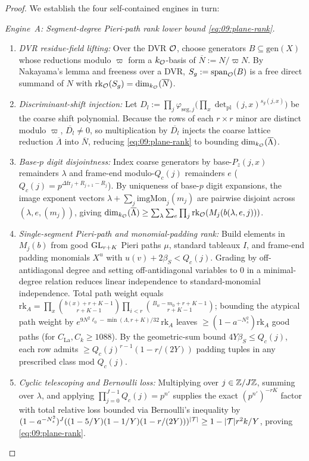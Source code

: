 \begin{proof}
We establish the four self-contained engines in turn:

\medskip\noindent
\emph{Engine~A: Segment-degree Pieri-path rank lower bound \eqref{eq:09:plane-rank}.}
\begin{enumerate}[label=\textup{\arabic*.}]
\item \emph{DVR residue-field lifting:} Over the DVR $\mathcal{O}$, choose generators $B \subseteq \mathrm{gen}(X)$ whose reductions modulo $\varpi$ form a $k_{\mathcal{O}}$-basis of $\overline{N} := N / \varpi N$. By Nakayama's lemma and freeness over a DVR, $S_g := \operatorname{span}_{\mathcal{O}}(B)$ is a free direct summand of $N$ with $\operatorname{rk}_{\mathcal{O}}(S_g) = \dim_{k_{\mathcal{O}}}(\overline{N})$.
\item \emph{Discriminant-shift injection:} Let $D_l := \prod_j \varphi_{\mathrm{seg},j}\bigl(\prod_{x} \det_{\mathrm{pl}}(j,x)^{s_g(j,x)}\bigr)$ be the coarse shift polynomial. Because the rows of each $r \times r$ minor are distinct modulo $\varpi$, $\overline{D_l} \neq 0$, so multiplication by $\overline{D_l}$ injects the coarse lattice reduction $\overline{\Lambda}$ into $\overline{N}$, reducing \eqref{eq:09:plane-rank} to bounding $\dim_{k_{\mathcal{O}}}(\overline{\Lambda})$.
\item \emph{Base-$p$ digit disjointness:} Index coarse generators by base-$P_z(j, x)$ remainders $\lambda$ and frame-end modulo-$Q_c(j)$ remainders $e$ ($Q_c(j) = p^{\Delta\mathrm{fr}_j + R_{j+1} - R_j}$). By uniqueness of base-$p$ digit expansions, the image exponent vectors $\lambda + \sum_j \mathrm{imgMon}_j(m_j)$ are pairwise disjoint across $(\lambda, e, (m_j))$, giving $\dim_{k_{\mathcal{O}}}(\overline{\Lambda}) \ge \sum_{\lambda}\sum_{e} \prod_j \operatorname{rk}_{\mathcal{O}}(M_j(b(\lambda, e, j)))$.
\item \emph{Single-segment Pieri-path and monomial-padding rank:} Build elements in $M_j(b)$ from good $\mathrm{GL}_{r+K}$ Pieri paths $\mu$, standard tableaux $I$, and frame-end padding monomials $X^u$ with $u(v) + 2\beta_S < Q_c(j)$. Grading by off-antidiagonal degree and setting off-antidiagonal variables to $0$ in a minimal-degree relation reduces linear independence to standard-monomial independence. Total path weight equals $\mathrm{rk}_A = \prod_{x}\binom{b(x)+r+K-1}{r+K-1}\prod_{i<r}\binom{B_w - m_0 + r + K - 1}{r+K-1}$; bounding the atypical path weight by $e^{9 N^2 \ell_0 - \min(\Lambda, r+K)/32}\,\mathrm{rk}_A$ leaves $\ge (1 - a^{-N_s^2})\mathrm{rk}_A$ good paths (for $C_{\mathrm{La}}, C_k \ge 1088$). By the geometric-sum bound $4 Y \beta_S \le Q_c(j)$, each row admits $\ge Q_c(j)^{r-1}(1 - r/(2Y))$ padding tuples in any prescribed class mod $Q_c(j)$.
\item \emph{Cyclic telescoping and Bernoulli loss:} Multiplying over $j \in \mathbb{Z}/J\mathbb{Z}$, summing over $\lambda$, and applying $\prod_{j=0}^{J-1} Q_c(j) = p^{n'}$ supplies the exact $(p^{n'})^{-rK}$ factor with total relative loss bounded via Bernoulli's inequality by $(1 - a^{-N_s^2})^J((1 - 5/Y)(1 - 1/Y)(1 - r/(2Y)))^{|\mathcal{T}|} \ge 1 - |\mathcal{T}|r^2 k / Y$, proving \eqref{eq:09:plane-rank}.
\end{enumerate}


\end{proof}
